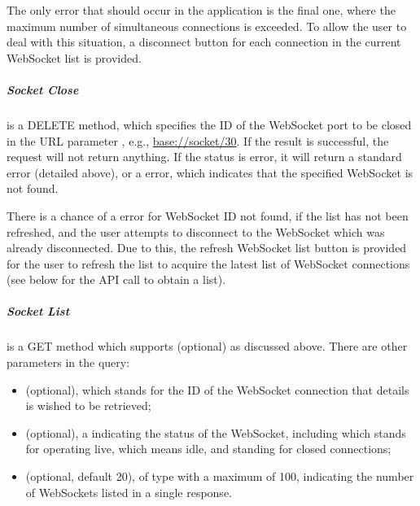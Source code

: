 The only error that should occur in the application is the final one, where the maximum number of simultaneous connections is exceeded. To allow the user to deal with this situation, a disconnect button for each connection in the current WebSocket list is provided.

\subparagraph{Socket Close}

 is a DELETE method, which specifies the ID of the WebSocket port to be closed in the URL parameter , e.g., \url{base://socket/30}. If the result is successful, the request will not return anything. If the status is error, it will return a standard error (detailed above), or a  error, which indicates that the specified WebSocket  is not found.

There is a chance of a  error for WebSocket ID not found, if the list has not been refreshed, and the user attempts to disconnect to the WebSocket which was already disconnected. Due to this, the refresh WebSocket list button is provided for the user to refresh the list to acquire the latest list of WebSocket connections (see below for the API call to obtain a list).

\subparagraph{Socket List}

 is a GET method which supports  (optional) as discussed above. There are other parameters in the query:
\begin{itemize}
    \item {} (optional), which stands for the ID of the WebSocket connection that details is wished to be retrieved;
    \item {} (optional), a  indicating the status of the WebSocket, including  which stands for operating live,  which means idle, and  standing for closed connections;
    \item {} (optional, default 20), of type  with a maximum of 100, indicating the number of WebSockets listed in a single response.
\end{itemize}

